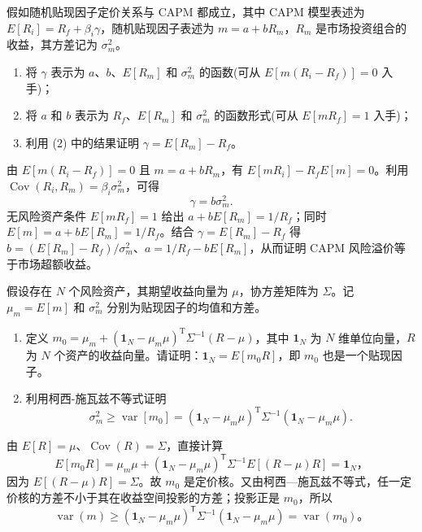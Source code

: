 \begin{problem}
 假如随机贴现因子定价关系与 CAPM 都成立，其中 CAPM 模型表述为 $E[R_i]=R_f+\beta_i\gamma$，随机贴现因子表述为 $m=a+bR_m$，$R_m$ 是市场投资组合的收益，其方差记为 $\sigma_m^2$。
\begin{enumerate}[label=(\alph*)]
    \item 将 $\gamma$ 表示为 $a$、$b$、$E[R_m]$ 和 $\sigma_m^2$ 的函数(可从 $E[m(R_i-R_f)]=0$ 入手)；
    \item 将 $a$ 和 $b$ 表示为 $R_f$、$E[R_m]$ 和 $\sigma_m^2$ 的函数形式(可从 $E[m R_f]=1$ 入手)；
    \item 利用 (2) 中的结果证明 $\gamma=E[R_m]-R_f$。
\end{enumerate}
\end{problem}
\begin{solution}
由 $E[m(R_i-R_f)]=0$ 且 $m=a+bR_m$，有 $E[mR_i]-R_fE[m]=0$。利用 $\operatorname{Cov}(R_i,R_m)=\beta_i\sigma_m^2$，可得
\[
\gamma=b\sigma_m^2.
\]
无风险资产条件 $E[mR_f]=1$ 给出 $a+bE[R_m]=1/R_f$；同时 $E[m]=a+bE[R_m]=1/R_f$。结合 $\gamma=E[R_m]-R_f$ 得 $b=(E[R_m]-R_f)/\sigma_m^2$、$a=1/R_f-bE[R_m]$，从而证明 CAPM 风险溢价等于市场超额收益。
\end{solution}
\begin{problem}
 假设存在 $N$ 个风险资产，其期望收益向量为 $\mu$，协方差矩阵为 $\Sigma$。记 $\mu_m=E[m]$ 和 $\sigma_m^2$ 分别为贴现因子的均值和方差。
\begin{enumerate}[label=(\alph*)]
    \item 定义 $m_0=\mu_m+(\mathbf{1}_N-\mu_m\mu)^{\mathrm{T}}\Sigma^{-1}(R-\mu)$，其中 $\mathbf{1}_N$ 为 $N$ 维单位向量，$R$ 为 $N$ 个资产的收益向量。请证明：$\mathbf{1}_N=E[m_0 R]$，即 $m_0$ 也是一个贴现因子。
    \item 利用柯西-施瓦兹不等式证明
    \[
        \sigma_m^2\ge \operatorname{var}[m_0]=(\mathbf{1}_N-\mu_m\mu)^{\mathrm{T}}\Sigma^{-1}(\mathbf{1}_N-\mu_m\mu).
    \]
\end{enumerate}
\end{problem}
\begin{solution}
由 $E[R]=\mu$、$\operatorname{Cov}(R)=\Sigma$，直接计算
\[
E[m_0R]=\mu_m\mu+(\mathbf{1}_N-\mu_m\mu)^{\mathsf T}\Sigma^{-1}E[(R-\mu)R]=\mathbf{1}_N，
\]
因为 $E[(R-\mu)R]=\Sigma$。故 $m_0$ 是定价核。又由柯西—施瓦兹不等式，任一定价核的方差不小于其在收益空间投影的方差；投影正是 $m_0$，所以
\[
\operatorname{var}(m)\ge(\mathbf{1}_N-\mu_m\mu)^{\mathsf T}\Sigma^{-1}(\mathbf{1}_N-\mu_m\mu)=\operatorname{var}(m_0)。
\]
\end{solution}
